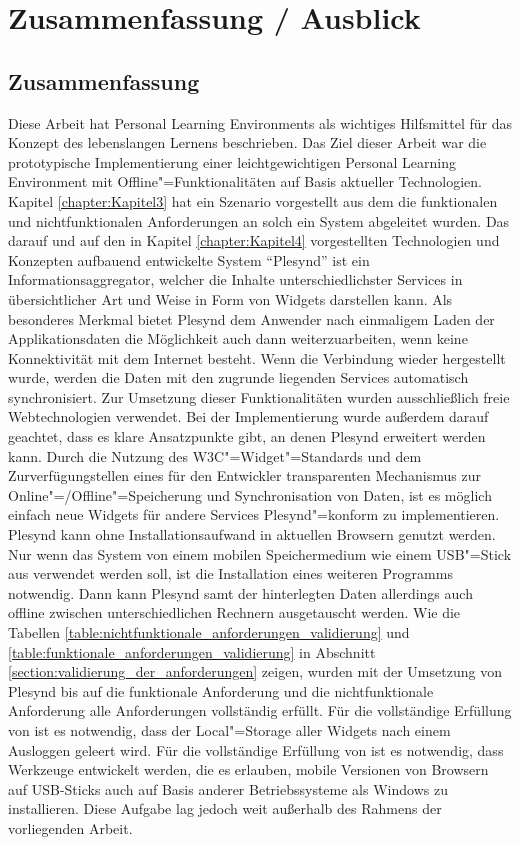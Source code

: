\chapter{Zusammenfassung / Ausblick}\label{chapter:Kapitel7}

\section{Zusammenfassung}
Diese Arbeit hat Personal Learning Environments als wichtiges Hilfsmittel für das Konzept des lebenslangen Lernens beschrieben. Das Ziel dieser Arbeit war die prototypische Implementierung einer leichtgewichtigen Personal Learning Environment mit Offline"=Funktionalitäten auf Basis aktueller Technologien. Kapitel \ref{chapter:Kapitel3} hat ein Szenario vorgestellt aus dem die funktionalen und nichtfunktionalen Anforderungen an solch ein System abgeleitet wurden. Das darauf und auf den in Kapitel \ref{chapter:Kapitel4} vorgestellten Technologien und Konzepten aufbauend entwickelte System "`Plesynd"' ist ein Informationsaggregator, welcher die Inhalte unterschiedlichster Services in übersichtlicher Art und Weise in Form von Widgets darstellen kann. Als besonderes Merkmal bietet Plesynd dem Anwender nach einmaligem Laden der Applikationsdaten die Möglichkeit auch dann weiterzuarbeiten, wenn keine Konnektivität mit dem Internet besteht. Wenn die Verbindung wieder hergestellt wurde, werden die Daten mit den zugrunde liegenden Services automatisch synchronisiert. Zur Umsetzung dieser Funktionalitäten wurden ausschließlich freie Webtechnologien verwendet. Bei der Implementierung wurde außerdem darauf geachtet, dass es klare Ansatzpunkte gibt, an denen Plesynd erweitert werden kann. Durch die Nutzung des W3C"=Widget"=Standards und dem Zurverfügungstellen eines für den Entwickler transparenten Mechanismus zur Online"=/Offline"=Speicherung und Synchronisation von Daten, ist es möglich einfach neue Widgets für andere Services Plesynd"=konform zu implementieren. Plesynd kann ohne Installationsaufwand in aktuellen Browsern genutzt werden. Nur wenn das System von einem mobilen Speichermedium wie einem USB"=Stick aus verwendet werden soll, ist die Installation eines weiteren Programms notwendig. Dann kann Plesynd samt der hinterlegten Daten allerdings auch offline zwischen unterschiedlichen Rechnern ausgetauscht werden.  Wie die Tabellen \ref{table:nichtfunktionale_anforderungen_validierung} und \ref{table:funktionale_anforderungen_validierung} in Abschnitt \ref{section:validierung_der_anforderungen} zeigen, wurden mit der Umsetzung von Plesynd bis auf die funktionale Anforderung  und die nichtfunktionale Anforderung  alle Anforderungen vollständig erfüllt. Für die vollständige Erfüllung von  ist es notwendig, dass der Local"=Storage aller Widgets nach einem Ausloggen geleert wird. Für die vollständige Erfüllung von  ist es notwendig, dass Werkzeuge entwickelt werden, die es erlauben, mobile Versionen von Browsern auf USB-Sticks auch auf Basis anderer Betriebssysteme als Windows zu installieren. Diese Aufgabe lag jedoch weit außerhalb des Rahmens der vorliegenden Arbeit.

